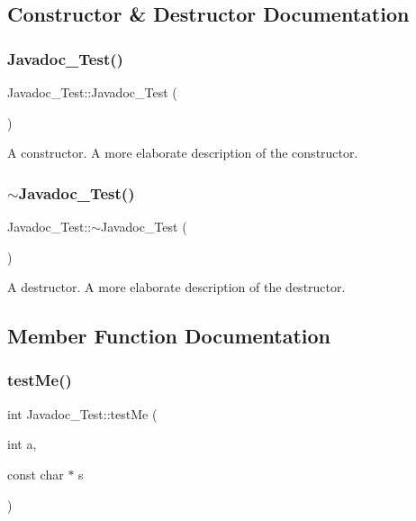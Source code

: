 \subsection{Constructor \& Destructor Documentation}
\mbox{\label{class_javadoc___test_a17313327932ae97596b0a455ba8342cc}} 
\subsubsection{\texorpdfstring{Javadoc\+\_\+\+Test()}{Javadoc\_Test()}}
{\footnotesize\ttfamily Javadoc\+\_\+\+Test\+::\+Javadoc\+\_\+\+Test (\begin{DoxyParamCaption}{ }\end{DoxyParamCaption})}

A constructor. A more elaborate description of the constructor. \mbox{\label{class_javadoc___test_a60016cd15a4ed82bbc35be79a0a6a6b5}} 
\subsubsection{\texorpdfstring{$\sim$\+Javadoc\+\_\+\+Test()}{~Javadoc\_Test()}}
{\footnotesize\ttfamily Javadoc\+\_\+\+Test\+::$\sim$\+Javadoc\+\_\+\+Test (\begin{DoxyParamCaption}{ }\end{DoxyParamCaption})}

A destructor. A more elaborate description of the destructor. 

\subsection{Member Function Documentation}
\mbox{\label{class_javadoc___test_a0c472683ed25ff096e8a9edfb18d550c}} 
\subsubsection{\texorpdfstring{test\+Me()}{testMe()}}
{\footnotesize\ttfamily int Javadoc\+\_\+\+Test\+::test\+Me (\begin{DoxyParamCaption}\item[{int}]{a,  }\item[{const char $\ast$}]{s }\end{DoxyParamCaption})}


